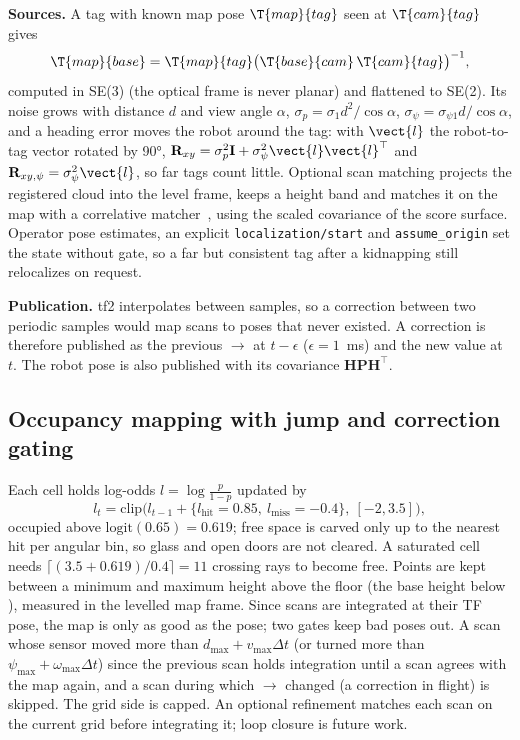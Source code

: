 \textbf{Sources.} A tag with known map pose $\T{map}{tag}$ seen at $\T{cam}{tag}$ gives
\begin{equation}
  \T{map}{base} = \T{map}{tag} \big(\T{base}{cam}\, \T{cam}{tag}\big)^{-1},
\end{equation}
computed in SE(3) (the optical frame is never planar) and flattened to SE(2). Its noise grows
with distance $d$ and view angle $\alpha$, $\sigma_p = \sigma_1 d^2/\cos\alpha$,
$\sigma_\psi = \sigma_{\psi1} d/\cos\alpha$, and a heading error moves the robot around the tag:
with $\vect{l}$ the robot-to-tag vector rotated by 90°, $\mathbf{R}_{xy} = \sigma_p^2\mathbf{I} +
\sigma_\psi^2\vect{l}\vect{l}^\top$ and $\mathbf{R}_{xy,\psi} = \sigma_\psi^2\vect{l}$, so far
tags count little. Optional scan matching projects the registered cloud into the level frame,
keeps a height band and matches it on the map with a correlative matcher~\cite{olson2009csm},
using the scaled covariance of the score surface. Operator pose estimates, an explicit
\texttt{localization/start} and \texttt{assume\_origin} set the state without gate, so a far
but consistent tag after a kidnapping still relocalizes on request.

\textbf{Publication.} tf2 interpolates between samples, so a correction between two periodic
samples would map scans to poses that never existed. A correction is therefore published as
the previous $\to$ at $t-\epsilon$ ($\epsilon = 1$~ms) and the new value at
$t$. The robot pose is also published with its covariance $\mathbf{H}\mathbf{P}\mathbf{H}^\top$.

\subsection{Occupancy mapping with jump and correction gating}
\label{sec:map}

Each cell holds log-odds $l = \log\frac{p}{1-p}$ updated by
\begin{equation}
  l_t = \mathrm{clip}\big(l_{t-1} + \{l_{\mathrm{hit}} = 0.85,\ l_{\mathrm{miss}} = -0.4\},\
  [-2, 3.5]\big),
\end{equation}
occupied above $\mathrm{logit}(0.65) = 0.619$; free space is carved only up to the nearest hit
per angular bin, so glass and open doors are not cleared. A saturated cell needs
$\lceil (3.5 + 0.619)/0.4 \rceil = 11$ crossing rays to become free. Points are kept between a
minimum and maximum height above the floor (the base height below \frm{base\_link}), measured in
the levelled map frame. Since scans are integrated at their TF pose, the map is only as good as
the pose; two gates keep bad poses out. A scan whose sensor moved more than
$d_{\max} + v_{\max}\Delta t$ (or turned more than $\psi_{\max} + \omega_{\max}\Delta t$) since
the previous scan holds integration until a scan agrees with the map again, and a scan during
which \frm{map}$\to$\frm{odom} changed (a correction in flight) is skipped. The grid side is
capped. An optional refinement matches each scan on the current grid before integrating it;
loop closure is future work.

